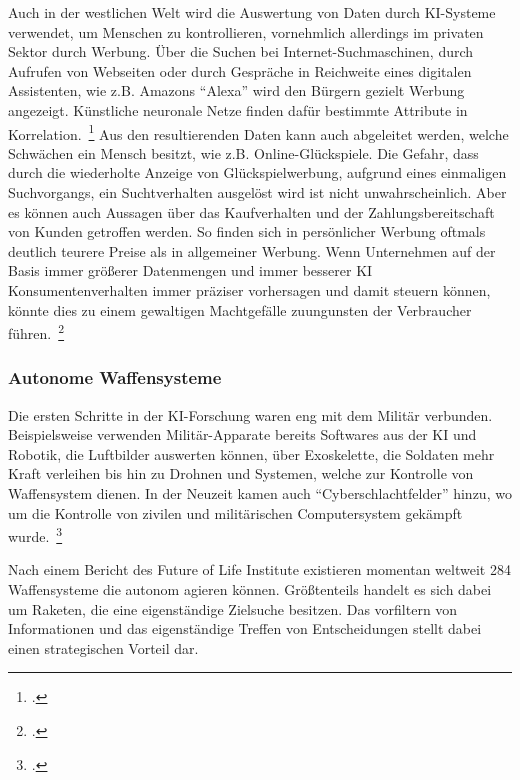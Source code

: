 Auch in der westlichen Welt wird die Auswertung von Daten durch \ac{KI}-Systeme verwendet, um Menschen zu kontrollieren, vornehmlich allerdings im privaten Sektor durch Werbung.
Über die Suchen bei Internet-Suchmaschinen, durch Aufrufen von Webseiten oder durch Gespräche in Reichweite eines digitalen Assistenten, wie z.B. Amazons \enquote{Alexa} wird den Bürgern
gezielt Werbung angezeigt. Künstliche neuronale Netze finden dafür bestimmte Attribute in Korrelation.~\footcite[\vglf][]{Kipper.2020}
Aus den resultierenden Daten kann auch abgeleitet werden, welche Schwächen ein Mensch besitzt, wie z.B. Online-Glückspiele. Die Gefahr, dass durch die wiederholte Anzeige von 
Glückspielwerbung, aufgrund eines einmaligen Suchvorgangs, ein Suchtverhalten ausgelöst wird ist nicht unwahrscheinlich.
Aber es können auch Aussagen über das Kaufverhalten und der Zahlungsbereitschaft von Kunden getroffen werden. So finden sich in persönlicher Werbung oftmals deutlich
teurere Preise als in allgemeiner Werbung.
Wenn Unternehmen auf der Basis immer größerer Datenmengen und immer besserer KI Konsumentenverhalten immer präziser vorhersagen und damit steuern können, 
könnte dies zu einem gewaltigen Machtgefälle zuungunsten der Verbraucher führen.~\footcite[\vglf][]{Kipper.2020}


\subsubsection{Autonome Waffensysteme}

Die ersten Schritte in der \ac{KI}-Forschung waren eng mit dem Militär verbunden. Beispielsweise verwenden Militär-Apparate bereits Softwares aus der \ac{KI} und Robotik, die Luftbilder auswerten können,
über Exoskelette, die Soldaten mehr Kraft verleihen bis hin zu Drohnen und Systemen, welche zur Kontrolle von Waffensystem dienen.
In der Neuzeit kamen auch \enquote{Cyberschlachtfelder} hinzu, wo um die Kontrolle von zivilen und militärischen Computersystem gekämpft wurde.~\footcite[\vglf][]{Lenzen.2020}

Nach einem Bericht des Future of Life Institute existieren momentan weltweit 284 Waffensysteme die autonom agieren können. Größtenteils handelt es sich dabei um Raketen,
die eine eigenständige Zielsuche besitzen. Das vorfiltern von Informationen und das eigenständige Treffen von Entscheidungen stellt dabei einen strategischen Vorteil dar. 

